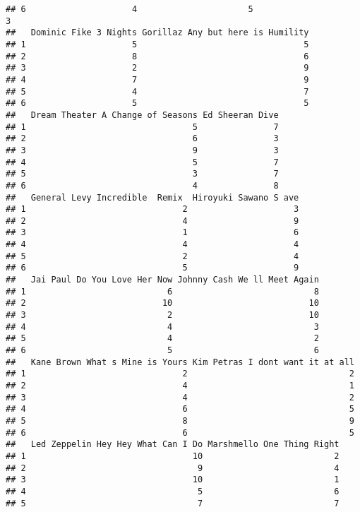 \documentclass[]{article}
\begin{document}
\begin{verbatim}
## 6                     4                      5                           3
##   Dominic Fike 3 Nights Gorillaz Any but here is Humility
## 1                     5                                 5
## 2                     8                                 6
## 3                     2                                 9
## 4                     7                                 9
## 5                     4                                 7
## 6                     5                                 5
##   Dream Theater A Change of Seasons Ed Sheeran Dive
## 1                                 5               7
## 2                                 6               3
## 3                                 9               3
## 4                                 5               7
## 5                                 3               7
## 6                                 4               8
##   General Levy Incredible  Remix  Hiroyuki Sawano S ave
## 1                               2                     3
## 2                               4                     9
## 3                               1                     6
## 4                               4                     4
## 5                               2                     4
## 6                               5                     9
##   Jai Paul Do You Love Her Now Johnny Cash We ll Meet Again
## 1                            6                            8
## 2                           10                           10
## 3                            2                           10
## 4                            4                            3
## 5                            4                            2
## 6                            5                            6
##   Kane Brown What s Mine is Yours Kim Petras I dont want it at all
## 1                               2                                2
## 2                               4                                1
## 3                               4                                2
## 4                               6                                5
## 5                               8                                9
## 6                               6                                5
##   Led Zeppelin Hey Hey What Can I Do Marshmello One Thing Right
## 1                                 10                          2
## 2                                  9                          4
## 3                                 10                          1
## 4                                  5                          6
## 5                                  7                          7

\end{verbatim}
\end{document}
